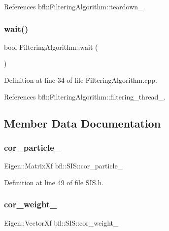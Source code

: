 References bfl\+::\+Filtering\+Algorithm\+::teardown\+\_\+.

\mbox{\label{classbfl_1_1FilteringAlgorithm_a40372c24fa050eb0274371172df0a244}} 
\subsubsection{\texorpdfstring{wait()}{wait()}}
{\footnotesize\ttfamily bool Filtering\+Algorithm\+::wait (\begin{DoxyParamCaption}{ }\end{DoxyParamCaption})\hspace{0.3cm}{\ttfamily [inherited]}}



Definition at line 34 of file Filtering\+Algorithm.\+cpp.



References bfl\+::\+Filtering\+Algorithm\+::filtering\+\_\+thread\+\_\+.



\subsection{Member Data Documentation}
\mbox{\label{classbfl_1_1SIS_aa4d63e8986156c13cc721c9c94c983d6}} 
\subsubsection{\texorpdfstring{cor\+\_\+particle\+\_\+}{cor\_particle\_}}
{\footnotesize\ttfamily Eigen\+::\+Matrix\+Xf bfl\+::\+S\+I\+S\+::cor\+\_\+particle\+\_\+\hspace{0.3cm}{\ttfamily [protected]}}



Definition at line 49 of file S\+I\+S.\+h.

\mbox{\label{classbfl_1_1SIS_a3e39c33d92371409b992fb4b856d48c0}} 
\subsubsection{\texorpdfstring{cor\+\_\+weight\+\_\+}{cor\_weight\_}}
{\footnotesize\ttfamily Eigen\+::\+Vector\+Xf bfl\+::\+S\+I\+S\+::cor\+\_\+weight\+\_\+\hspace{0.3cm}{\ttfamily [protected]}}



